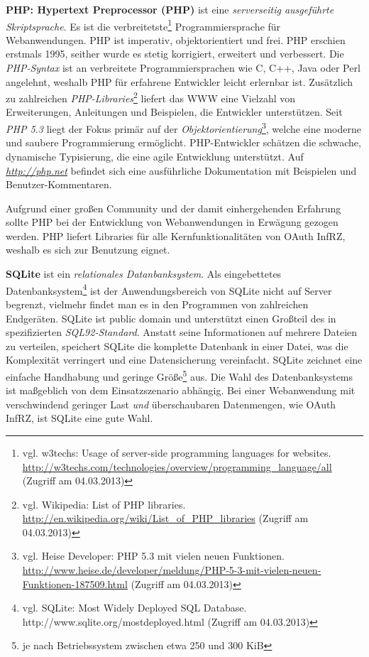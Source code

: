 \documentclass[12pt,a4paper,pointednumbers,abstracton]{scrartcl}
\begin{document}
\textbf{PHP: Hypertext Preprocessor (PHP)} ist eine \emph{serverseitig ausgeführte Skriptsprache}.
Es ist die verbreitetste\footnote{vgl. w3techs: Usage of server-side programming languages for websites. \url{http://w3techs.com/technologies/overview/programming_language/all} (Zugriff am 04.03.2013)} Programmiersprache für Webanwendungen.
PHP ist imperativ, objektorientiert und frei.
PHP erschien erstmals 1995, seither wurde es stetig korrigiert, erweitert und verbessert.
Die \emph{PHP-Syntax} ist an verbreitete Programmiersprachen wie C, C++, Java oder Perl angelehnt, weshalb PHP für erfahrene Entwickler leicht erlernbar ist.
Zusätzlich zu zahlreichen \emph{PHP-Libraries}\footnote{vgl. Wikipedia: List of PHP libraries. \url{http://en.wikipedia.org/wiki/List_of_PHP_libraries} (Zugriff am 04.03.2013)} liefert  das WWW eine Vielzahl von Erweiterungen, Anleitungen und Beispielen, die Entwickler unterstützen.
Seit \emph{PHP 5.3} liegt der Fokus primär auf der \emph{Objektorientierung}\footnote{vgl. Heise Developer: PHP 5.3 mit vielen neuen Funktionen. \url{http://www.heise.de/developer/meldung/PHP-5-3-mit-vielen-neuen-Funktionen-187509.html} (Zugriff am 04.03.2013)}, welche eine moderne und saubere Programmierung ermöglicht.
PHP-Entwickler schätzen die schwache, dynamische Typisierung, die eine agile Entwicklung unterstützt.
Auf \emph{\url{http://php.net}} befindet sich eine ausführliche Dokumentation mit Beispielen und Benutzer-Kommentaren.

Aufgrund einer großen Community und der damit einhergehenden Erfahrung sollte PHP bei der Entwicklung von Webanwendungen in Erwägung gezogen werden.
PHP liefert Libraries für alle Kernfunktionalitäten von OAuth InfRZ, weshalb es sich zur Benutzung eignet.

\textbf{SQLite} ist ein \emph{relationales Datanbanksystem}.
Als eingebettetes Datenbanksystem\footnote{vgl. SQLite: Most Widely Deployed SQL Database. http://www.sqlite.org/mostdeployed.html (Zugriff am 04.03.2013)} ist der Anwendungsbereich von SQLite nicht auf Server begrenzt, vielmehr findet man es in den Programmen von zahlreichen Endgeräten.
SQLite ist public domain und unterstützt einen Großteil des in \cite{SQL1992} spezifizierten \emph{SQL92-Standard}.
Anstatt seine Informationen auf mehrere Dateien zu verteilen, speichert SQLite die komplette Datenbank in einer Datei, was die Komplexität verringert und eine Datensicherung vereinfacht.
SQLite zeichnet eine einfache Handhabung und geringe Größe\footnote{je nach Betriebssystem zwischen etwa 250 und 300 KiB} aus.
Die Wahl des Datenbanksystems ist maßgeblich von dem Einsatzszenario abhängig. Bei einer Webanwendung mit verschwindend geringer Last \emph{und} überschaubaren Datenmengen, wie OAuth InfRZ, ist SQLite eine gute Wahl.
\end{document}

